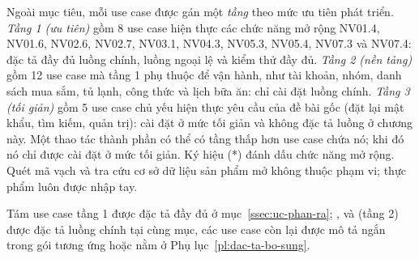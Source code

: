 Ngoài mục tiêu, mỗi use case được gán một \emph{tầng} theo mức ưu tiên phát triển. \emph{Tầng 1 (ưu tiên)} gồm 8 use case hiện thực các chức năng mở rộng NV01.4, NV01.6, NV02.6, NV02.7, NV03.1, NV04.3, NV05.3, NV05.4, NV07.3 và NV07.4: đặc tả đầy đủ luồng chính, luồng ngoại lệ và kiểm thử đầy đủ. \emph{Tầng 2 (nền tảng)} gồm 12 use case mà tầng 1 phụ thuộc để vận hành, như tài khoản, nhóm, danh sách mua sắm, tủ lạnh, công thức và lịch bữa ăn: chỉ cài đặt luồng chính. \emph{Tầng 3 (tối giản)} gồm 5 use case chủ yếu hiện thực yêu cầu của đề bài gốc (đặt lại mật khẩu, tìm kiếm, quản trị): cài đặt ở mức tối giản và không đặc tả luồng ở chương này. Một thao tác thành phần có thể có tầng thấp hơn use case chứa nó; khi đó nó chỉ được cài đặt ở mức tối giản. Ký hiệu (*) đánh dấu chức năng mở rộng. Quét mã vạch và tra cứu cơ sở dữ liệu sản phẩm mở không thuộc phạm vi; thực phẩm luôn được nhập tay.

Tám use case tầng 1 được đặc tả đầy đủ ở mục~\ref{ssec:uc-phan-ra}; ,  và  (tầng 2) được đặc tả luồng chính tại cùng mục, các use case còn lại được mô tả ngắn trong gói tương ứng hoặc nằm ở Phụ lục~\ref{pl:dac-ta-bo-sung}.


